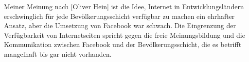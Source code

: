 \documentclass{article}
\begin{document}
\medskip

Meiner Meinung nach [Oliver Hein] ist die Idee, Internet in Entwicklungsländern erschwinglich für jede Bevölkerungsschicht verfügbar zu machen ein ehrhafter Ansatz, aber die Umsetzung von Facebook war schwach. Die Eingrenzung der Verfügbarkeit von Internetseiten spricht gegen die freie Meinungsbildung und die Kommunikation zwischen Facebook und der Bevölkerungsschicht, die es betrifft mangelhaft bis gar nicht vorhanden.

\break
\printbibliography
\end{document}
